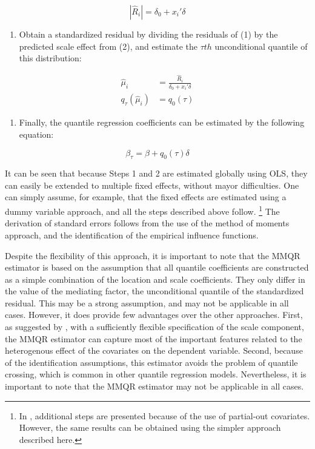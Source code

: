 \documentclass[bib]{statapress}
\providecommand{\tightlist}{%
  \setlength{\itemsep}{0pt}\setlength{\parskip}{0pt}}\usepackage{longtable,booktabs,array}
\begin{document}
\[|\hat R_i| = \delta_0 + x_{i}' \delta\]

\begin{enumerate}
\def\labelenumi{\arabic{enumi}.}
\setcounter{enumi}{2}
\tightlist
\item
  Obtain a standardized residual by dividing the residuals of (1) by the
  predicted scale effect from (2), and estimate the \(\tau th\)
  unconditional quantile of this distribution:
\end{enumerate}

\[\begin{aligned}
\hat \mu_i &= \frac{\hat R_i}{\delta_0 + x_{i}' \delta} \\
q_{\tau}(\hat \mu_i) &= q_0(\tau)
\end{aligned}
\]

\begin{enumerate}
\def\labelenumi{\arabic{enumi}.}
\setcounter{enumi}{3}
\tightlist
\item
  Finally, the quantile regression coefficients can be estimated by the
  following equation:
\end{enumerate}

\[\beta_{\tau} = \beta + q_0(\tau) \delta
\]

It can be seen that because Steps 1 and 2 are estimated globally using
OLS, they can easily be extended to multiple fixed effects, without
mayor difficulties. One can simply assume, for example, that the fixed
effects are estimated using a dummy variable approach, and all the steps
described above follow. \footnote{In \citet{riosavila2024}, additional
  steps are presented because of the use of partial-out covariates.
  However, the same results can be obtained using the simpler approach
  described here.} The derivation of standard errors follows from the
use of the method of moments approach, and the identification of the
empirical influence functions.

Despite the flexibility of this approach, it is important to note that
the MMQR estimator is based on the assumption that all quantile
coefficients are constructed as a simple combination of the location and
scale coefficients. They only differ in the value of the mediating
factor, the unconditional quantile of the standardized residual. This
may be a strong assumption, and may not be applicable in all cases.
However, it does provide few advantages over the other approaches.
First, as suggested by \citet{mss2019}, with a sufficiently flexible
specification of the scale component, the MMQR estimator can capture
most of the important features related to the heterogenous effect of the
covariates on the dependent variable. Second, because of the
identification assumptions, this estimator avoids the problem of
quantile crossing, which is common in other quantile regression models.
Nevertheless, it is important to note that the MMQR estimator may not be
applicable in all cases.
\end{document}
